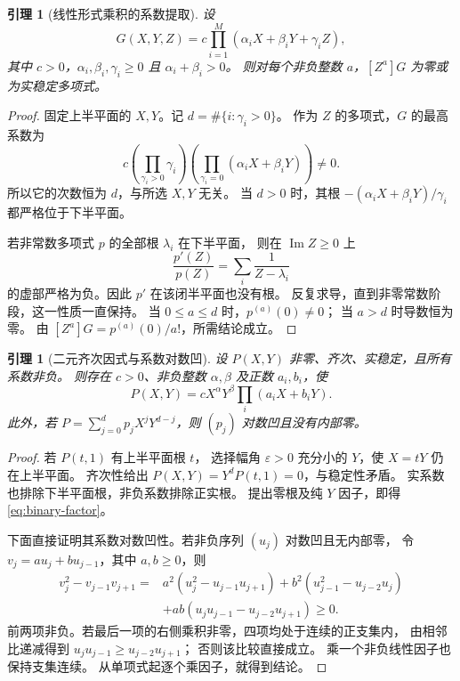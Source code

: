\documentclass[UTF8,a4paper,11pt,fontset=none]{ctexart}
\numberwithin{equation}{section}
\theoremstyle{paperplain}
\newtheorem{lemma}[theorem]{引理}
\theoremstyle{definition}
\theoremstyle{remark}
\DeclareMathOperator{\Impart}{Im}
\begin{document}
\begin{lemma}[线性形式乘积的系数提取]\label{lem:extract}
设
\[
G(X,Y,Z)=c\prod_{i=1}^M(\alpha_iX+\beta_iY+\gamma_iZ),
\]
其中 $c>0$，$\alpha_i,\beta_i,\gamma_i\ge0$ 且 $\alpha_i+\beta_i>0$。
则对每个非负整数 $a$，$[Z^a]G$ 为零或为实稳定多项式。
\end{lemma}
\begin{proof}
固定上半平面的 $X,Y$。记 $d=\#\{i:\gamma_i>0\}$。
作为 $Z$ 的多项式，$G$ 的最高系数为
\[
c\left(\prod_{\gamma_i>0}\gamma_i\right)
\left(\prod_{\gamma_i=0}(\alpha_iX+\beta_iY)\right)\ne0.
\]
所以它的次数恒为 $d$，与所选 $X,Y$ 无关。
当 $d>0$ 时，其根
$-(\alpha_iX+\beta_iY)/\gamma_i$ 都严格位于下半平面。

若非常数多项式 $p$ 的全部根 $\lambda_i$ 在下半平面，
则在 $\Impart Z\ge0$ 上
\[
\frac{p'(Z)}{p(Z)}=\sum_i\frac1{Z-\lambda_i}
\]
的虚部严格为负。因此 $p'$ 在该闭半平面也没有根。
反复求导，直到非零常数阶段，这一性质一直保持。
当 $0\le a\le d$ 时，$p^{(a)}(0)\ne0$；
当 $a>d$ 时导数恒为零。
由 $[Z^a]G=p^{(a)}(0)/a!$，所需结论成立。
\end{proof}

\begin{lemma}[二元齐次因式与系数对数凹]\label{lem:homogeneous}
设 $P(X,Y)$ 非零、齐次、实稳定，且所有系数非负。
则存在 $c>0$、非负整数 $\alpha,\beta$ 及正数 $a_i,b_i$，使
\begin{equation}\label{eq:binary-factor}
P(X,Y)=cX^\alpha Y^\beta\prod_i(a_iX+b_iY).
\end{equation}
此外，若 $P=\sum_{j=0}^d p_jX^jY^{d-j}$，则 $(p_j)$ 对数凹且没有内部零。
\end{lemma}
\begin{proof}
若 $P(t,1)$ 有上半平面根 $t$，
选择幅角 $\varepsilon>0$ 充分小的 $Y$，使 $X=tY$ 仍在上半平面。
齐次性给出 $P(X,Y)=Y^dP(t,1)=0$，与稳定性矛盾。
实系数也排除下半平面根，非负系数排除正实根。
提出零根及纯 $Y$ 因子，即得 \eqref{eq:binary-factor}。

下面直接证明其系数对数凹性。若非负序列 $(u_j)$ 对数凹且无内部零，
令 $v_j=a u_j+b u_{j-1}$，其中 $a,b\ge0$，则
\begin{align*}
v_j^2-v_{j-1}v_{j+1}
={}&a^2(u_j^2-u_{j-1}u_{j+1})
+b^2(u_{j-1}^2-u_{j-2}u_j)\\
&+ab(u_ju_{j-1}-u_{j-2}u_{j+1})\ge0.
\end{align*}
前两项非负。若最后一项的右侧乘积非零，四项均处于连续的正支集内，
由相邻比递减得到 $u_ju_{j-1}\ge u_{j-2}u_{j+1}$；
否则该比较直接成立。
乘一个非负线性因子也保持支集连续。
从单项式起逐个乘因子，就得到结论。
\end{proof}
\end{document}

